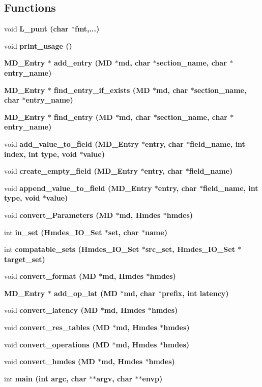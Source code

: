 \subsection*{Functions}
\begin{CompactItemize}
\item 
void \bf{L\_\-punt} (char $\ast$fmt,...)
\item 
void \bf{print\_\-usage} ()
\item 
\bf{MD\_\-Entry} $\ast$ \bf{add\_\-entry} (\bf{MD} $\ast$md, char $\ast$section\_\-name, char $\ast$entry\_\-name)
\item 
\bf{MD\_\-Entry} $\ast$ \bf{find\_\-entry\_\-if\_\-exists} (\bf{MD} $\ast$md, char $\ast$section\_\-name, char $\ast$entry\_\-name)
\item 
\bf{MD\_\-Entry} $\ast$ \bf{find\_\-entry} (\bf{MD} $\ast$md, char $\ast$section\_\-name, char $\ast$entry\_\-name)
\item 
void \bf{add\_\-value\_\-to\_\-field} (\bf{MD\_\-Entry} $\ast$\bf{entry}, char $\ast$field\_\-name, int index, int type, void $\ast$value)
\item 
void \bf{create\_\-empty\_\-field} (\bf{MD\_\-Entry} $\ast$\bf{entry}, char $\ast$field\_\-name)
\item 
void \bf{append\_\-value\_\-to\_\-field} (\bf{MD\_\-Entry} $\ast$\bf{entry}, char $\ast$field\_\-name, int type, void $\ast$value)
\item 
void \bf{convert\_\-Parameters} (\bf{MD} $\ast$md, \bf{Hmdes} $\ast$hmdes)
\item 
int \bf{in\_\-set} (\bf{Hmdes\_\-IO\_\-Set} $\ast$set, char $\ast$\bf{name})
\item 
int \bf{compatable\_\-sets} (\bf{Hmdes\_\-IO\_\-Set} $\ast$src\_\-set, \bf{Hmdes\_\-IO\_\-Set} $\ast$target\_\-set)
\item 
void \bf{convert\_\-format} (\bf{MD} $\ast$md, \bf{Hmdes} $\ast$hmdes)
\item 
\bf{MD\_\-Entry} $\ast$ \bf{add\_\-op\_\-lat} (\bf{MD} $\ast$md, char $\ast$prefix, int latency)
\item 
void \bf{convert\_\-latency} (\bf{MD} $\ast$md, \bf{Hmdes} $\ast$hmdes)
\item 
void \bf{convert\_\-res\_\-tables} (\bf{MD} $\ast$md, \bf{Hmdes} $\ast$hmdes)
\item 
void \bf{convert\_\-operations} (\bf{MD} $\ast$md, \bf{Hmdes} $\ast$hmdes)
\item 
void \bf{convert\_\-hmdes} (\bf{MD} $\ast$md, \bf{Hmdes} $\ast$hmdes)
\item 
int \bf{main} (int argc, char $\ast$$\ast$argv, char $\ast$$\ast$envp)
\end{CompactItemize}
